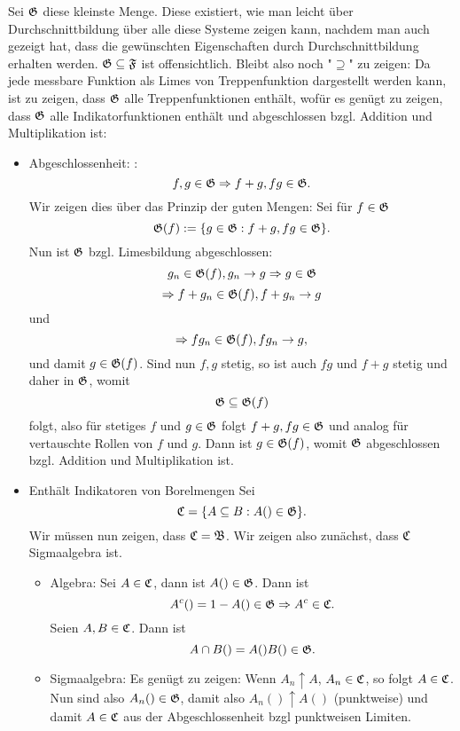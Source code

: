 			\begin{bew}
				Sei $\mathfrak{G}$ diese kleinste Menge. Diese existiert, wie man leicht über Durchschnittbildung über alle diese Systeme zeigen kann, nachdem man auch gezeigt hat, dass die gewünschten Eigenschaften durch Durchschnittbildung erhalten werden.\newline
				$\mathfrak{G}\subseteq \mathfrak{F}$ ist offensichtlich. Bleibt also noch "$\supseteq$" zu zeigen:\newline
				Da jede messbare Funktion als Limes von Treppenfunktion dargestellt werden kann, ist zu zeigen, dass $\mathfrak{G}$ alle Treppenfunktionen enthält, wofür es genügt zu zeigen, dass $\mathfrak{G}$ alle Indikatorfunktionen enthält und abgeschlossen bzgl. Addition und Multiplikation ist:
				\begin{itemize}
					\item Abgeschlossenheit:\newline
					\zz:
					\[ f,g\in\mathfrak{G}\Rightarrow f+g,fg\in\mathfrak{G}. \]
					Wir zeigen dies über das Prinzip der guten Mengen: Sei für $f\in\mathfrak{G}$
					\[ \mathfrak{G}(f):=\{g\in\mathfrak{G}: f+g,fg\in\mathfrak{G}\}. \]
					Nun ist $\mathfrak{G}$ bzgl. Limesbildung abgeschlossen:
					\[ g_n\in\mathfrak{G}(f), g_n\to g\Rightarrow g\in\mathfrak{G} \]
					\[ \Rightarrow f+g_n\in\mathfrak{G}(f), f+g_n\to g \]
					und
					\[ \Rightarrow fg_n\in\mathfrak{G}(f), fg_n\to g, \]
					und damit $g\in \mathfrak{G}(f)$. Sind nun $f,g$ stetig, so ist auch $fg$ und $f+g$ stetig und daher in $\mathfrak{G}$, womit
					\[ \mathfrak{G}\subseteq \mathfrak{G}(f) \]
					folgt, also für stetiges $f$ und $g\in\mathfrak{G}$ folgt $f+g, fg\in\mathfrak{G}$ und analog für vertauschte Rollen von $f$ und $g$. Dann ist $g\in\mathfrak{G}(f)$, womit $\mathfrak{G}$ abgeschlossen bzgl. Addition und Multiplikation ist. 
					\item Enthält Indikatoren von Borelmengen
					Sei 
					\[ \mathfrak{C}=\{A\subseteq B: A()\in\mathfrak{G}\}. \]
					Wir müssen nun zeigen, dass $\mathfrak{C}=\mathfrak{B}$. Wir zeigen also zunächst, dass $\mathfrak{C}$ Sigmaalgebra ist. 
					\begin{itemize}
						\item Algebra:\newline
						Sei $A\in\mathfrak{C}$, dann ist $A()\in\mathfrak{G}$. Dann ist
						\[ A^c()=1-A()\in\mathfrak{G}\Rightarrow A^c\in\mathfrak{C}. \]
						Seien $A,B\in\mathfrak{C}$. Dann ist 
						\[ A\cap B()=A()B()\in\mathfrak{G}. \]
						\item Sigmaalgebra:\newline
						Es genügt zu zeigen: Wenn $A_n\uparrow A$, $A_n\in\mathfrak{C}$, so folgt $A\in\mathfrak{C}$. Nun sind also $A_n()\in\mathfrak{G}$, damit also $A_n()\uparrow A()$ (punktweise) und damit $A\in\mathfrak{C}$ aus der Abgeschlossenheit bzgl punktweisen Limiten. 

\end{itemize}
\end{itemize}
\end{bew}
